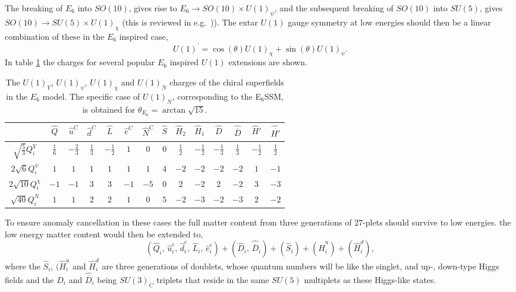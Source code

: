 \documentclass[preprint,amsmath,amssymb,aps,superscriptaddress,prd,showpacs,floatfix]{revtex4-1}
\newcommand{\be}{\begin{equation}}
\newcommand{\ee}{\end{equation}}
\begin{document}
The breaking of $E_6$ into $SO(10)$, gives rise to $E_6\to
SO(10)\times U(1)_{\psi}$, and the subsequent breaking of $SO(10)$
into $SU(5)$, gives $SO(10)\to SU(5)\times U(1)_{\chi}$ (this is
reviewed in e.g.~\cite{Langacker:2008yv})). The extar $U(1)$ gauge symmetry at low energies should then be a linear combination of these in the $E_6$ inspired case,
\be
U(1)^\prime = \cos(\theta) U(1)_{\chi} + \sin(\theta) U(1)_{\psi}.
\ee In table \ref{tab:E6charges} the charges for several popular $E_6$ inspired $U(1)$ extensions are shown.
\begin{table}[h]
\centering
\begin{ruledtabular}
\begin{tabular}{cccccccccccccc}
 & $\hat{Q}$ & $\hat{u}^C$ & $\hat{d}^C$ & $\hat{L}$ & $\hat{e}^C$ & $\hat{N}^C$ & $\hat{S}$ & $\hat{H}_2$ & $\hat{H}_1$ & $\hat{D}$ & $\hat{\overline{D}}$ & $\hat{H}'$ & $\hat{\overline{H'}}$ \\[1mm]
\hline
$\sqrt{\frac{5}{3}}Q_i^Y$ & $\frac{1}{6}$ & $-\frac{2}{3}$ & $\frac{1}{3}$ & $-\frac{1}{2}$ & $1$ & $0$ & $0$ & $\frac{1}{2}$ & $-\frac{1}{2}$ & $-\frac{1}{3}$ & $\frac{1}{3}$ & $-\frac{1}{2}$ & $\frac{1}{2}$ \\[1mm]
$2\sqrt{6}Q_i^\psi$ & $1$ & $1$ & $1$ & $1$ & $1$ & $1$ & $4$ & $-2$ & $-2$ & $-2$ & $-2$ & $1$ & $-1$\\[1mm]
$2\sqrt{10}Q_i^\chi$ & $-1$ & $-1$ & $3$ & $3$ & $-1$ & $-5$ & $0$ & $2$ & $-2$ & $2$ & $-2$ & $3$ & $-3$\\[1mm]
$\sqrt{40}Q_i^N$ & $1$ & $1$ & $2$ & $2$ & $1$ & $0$ & $5$ & $-2$ & $-3$ & $-2$ & $-3$ & $2$ & $-2$ \\[1mm]
\end{tabular}
\end{ruledtabular}
\caption{The $U(1)_Y$, $U(1)_\psi$, $U(1)_\chi$ and $U(1)_N$ charges of the chiral superfields in the $E_6$ model. The specific case of $U(1)_N$, corresponding to the E$_6$SSM, is obtained for $\theta_{E_6}=\arctan\sqrt{15}$.}
\label{tab:E6charges}
\end{table}

To ensure anomaly cancellation in these cases the full matter content
from three generations of $27$-plets should survive to low energies.
the low energy matter content would then be extended to, \be
(\hat{Q}_i,\,\hat{u}^c_i,\,\hat{d}^c_i,\,\hat{L}_i,\,\hat{e}^c_i)
+(\hat{D}_i,\,\hat{\overline{D}}_i)+(\hat{S}_{i})+(\hat{H}^u_i)+(\hat{H}^d_i),\ee
where the $\hat{S}_{i}$, $(\hat{H}^u_i$ and $\hat{H}^d_i$ are three
generations of doublets, whose quantum numbers will be like the
singlet, and up-, down-type Higgs fields and the $\hat{D}_i$ and
$\hat{\overline{D}}_i$ being $SU(3)_C$ triplets that reside in the same $SU(5)$
multiplets as these Higgs-like states.
\end{document}
